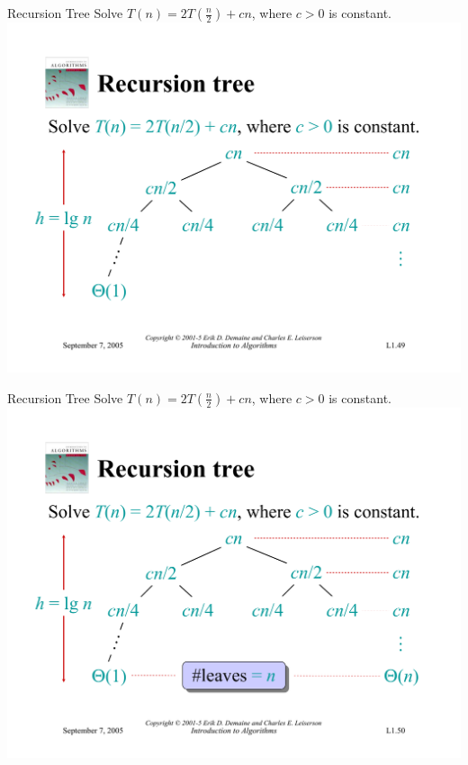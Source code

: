 \documentclass{beamer}
\begin{document}
\begin{frame}{Recursion Tree}
    Solve $T(n) = 2T(\frac{n}{2}) + cn$, where $c > 0$ is constant.\\
    \vspace{5mm}
    \centering
    \includegraphics[width=\textwidth, trim={0.49cm 1.25cm 0.7cm 5.75cm}, clip]{pages/lec1_49}
\end{frame}
\begin{frame}{Recursion Tree}
    Solve $T(n) = 2T(\frac{n}{2}) + cn$, where $c > 0$ is constant.\\
    \vspace{5mm}
    \centering
    \includegraphics[width=\textwidth, trim={0.49cm 1.25cm 0.7cm 5.75cm}, clip]{pages/lec1_50}
\end{frame}
\end{document}
